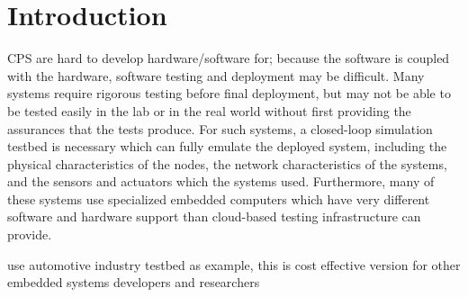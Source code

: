 \section{Introduction}


CPS are hard to develop hardware/software for; because the software is coupled with the hardware, software testing and deployment may be difficult.  Many systems require rigorous testing before final deployment, but may not be able to be tested easily in the lab or in the real world without first providing the assurances that the tests produce.  For such systems, a closed-loop simulation testbed is necessary which can fully emulate the deployed system, including the physical characteristics of the nodes, the network characteristics of the systems, and the sensors and actuators which the systems used.  Furthermore, many of these systems use specialized embedded computers which have very different software and hardware support than cloud-based testing infrastructure can provide.  

use automotive industry testbed as example, this is cost effective version for other embedded systems developers and researchers
